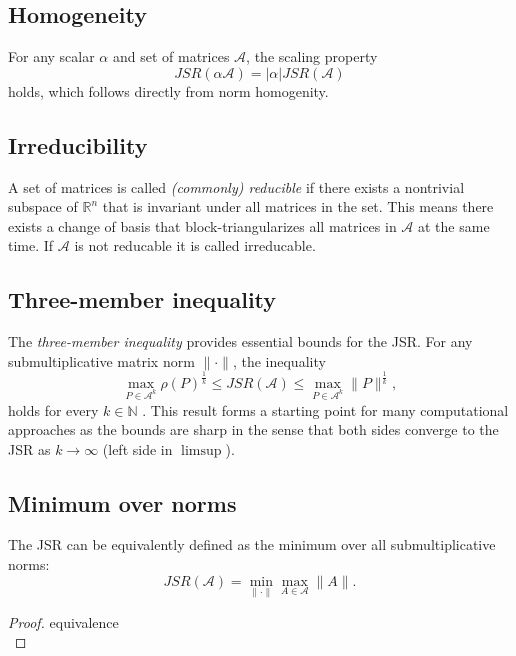 \subsection*{Homogeneity}
For any scalar $\alpha$ and set of matrices $\mathcal{A}$, the scaling property
\begin{equation}
    JSR(\alpha \mathcal{A}) = |\alpha| JSR(\mathcal{A})
\end{equation}
holds, which follows directly from norm homogenity. 

\subsection*{Irreducibility}
A set of matrices is called \emph{(commonly) reducible} if there exists a nontrivial subspace of $\mathbb{R}^n$ that is invariant under all matrices in the set. This means there exists a change of basis that block-triangularizes all matrices in $\mathcal{A}$ at the same time. If $\mathcal{A}$ is not reducable it is called irreducable. 

\subsection*{Three-member inequality}
The \emph{three-member inequality} provides essential bounds for the JSR. For any submultiplicative matrix norm $\|\cdot\|$, the inequality
\begin{equation}
    \max_{P \in \mathcal{A}^k} \rho(P)^{\frac{1}{k}} \leq JSR(\mathcal{A}) \leq \max_{P \in \mathcal{A}^k} \| P\|^{\frac{1}{k}},
    \label{eq:three-member}
\end{equation}
holds for every $k \in \mathbb{N}$ \citep{jungersJointSpectralRadius2009}. This result forms a starting point for many computational approaches as the bounds are sharp in the sense that both sides converge to the JSR as $k\rightarrow \infty$ (left side in $\limsup$).

\subsection*{Minimum over norms}
The JSR can be equivalently defined as the minimum over all submultiplicative norms:
\begin{equation}
    JSR(\mathcal{A}) = \min_{\|\cdot\|} \max_{A \in \mathcal{A}} \|A\|.
\end{equation}
\begin{proof}{equivalence\\}

\end{proof}

